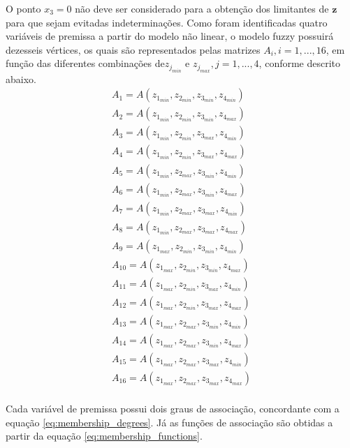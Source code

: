 O ponto $x_3 = 0$ não deve ser considerado para a obtenção dos limitantes de $\textbf{z}$ para que sejam evitadas indeterminações. Como foram identificadas quatro variáveis de premissa a partir do modelo não linear, o modelo fuzzy possuirá dezesseis vértices, os quais são representados pelas matrizes $A_i, i = 1, ... ,16$, em função das diferentes combinações de$ z_{j_{min}}$ e $z_{j_{max}}, j = 1, ..., 4$, conforme descrito abaixo.
\begin{equation}\label{eq:A_fuzzy_4_vertices}
\begin{gathered}
A_1 = A(z_{1_{min}}, z_{2_{min}}, z_{3_{min}}, z_{4_{min}})\\
A_2 = A(z_{1_{min}}, z_{2_{min}}, z_{3_{min}}, z_{4_{max}})\\
A_3 = A(z_{1_{min}}, z_{2_{min}}, z_{3_{max}}, z_{4_{min}})\\
A_4 = A(z_{1_{min}}, z_{2_{min}}, z_{3_{max}}, z_{4_{max}})\\
A_5 = A(z_{1_{min}}, z_{2_{max}}, z_{3_{min}}, z_{4_{min}})\\
A_6 = A(z_{1_{min}}, z_{2_{max}}, z_{3_{min}}, z_{4_{max}})\\
A_7 = A(z_{1_{min}}, z_{2_{max}}, z_{3_{max}}, z_{4_{min}})\\
A_8 = A(z_{1_{min}}, z_{2_{max}}, z_{3_{max}}, z_{4_{max}})\\
A_9 = A(z_{1_{max}}, z_{2_{min}}, z_{3_{min}}, z_{4_{min}})\\
A_{10} = A(z_{1_{max}}, z_{2_{min}}, z_{3_{min}}, z_{4_{max}})\\
A_{11} = A(z_{1_{max}}, z_{2_{min}}, z_{3_{max}}, z_{4_{min}})\\
A_{12} = A(z_{1_{max}}, z_{2_{min}}, z_{3_{max}}, z_{4_{max}})\\
A_{13} = A(z_{1_{max}}, z_{2_{max}}, z_{3_{min}}, z_{4_{min}})\\
A_{14} = A(z_{1_{max}}, z_{2_{max}}, z_{3_{min}}, z_{4_{max}})\\
A_{15} = A(z_{1_{max}}, z_{2_{max}}, z_{3_{max}}, z_{4_{min}})\\
A_{16} = A(z_{1_{max}}, z_{2_{max}}, z_{3_{max}}, z_{4_{max}})\\
\end{gathered}
\end{equation}

Cada variável de premissa possui dois graus de associação, concordante com a equação \ref{eq:membership_degrees}. Já as funções de associação são obtidas a partir da equação \ref{eq:membership_functions}.

